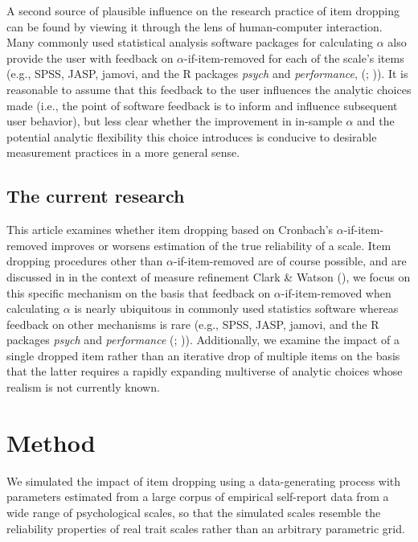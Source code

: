 \documentclass[
  nonatbib,
  authoryear,
  preprint]{elsarticle}
\begin{document}
A second source of plausible influence on the research practice of item
dropping can be found by viewing it through the lens of human-computer
interaction. Many commonly used statistical analysis software packages
for calculating \(\alpha\) also provide the user with feedback on
\(\alpha\)-if-item-removed for each of the scale's items (e.g., SPSS,
JASP, jamovi, and the R packages \emph{psych} and \emph{performance},
(;
)). It is reasonable to
assume that this feedback to the user influences the analytic choices
made (i.e., the point of software feedback is to inform and influence
subsequent user behavior), but less clear whether the improvement in
in-sample \(\alpha\) and the potential analytic flexibility this choice
introduces is conducive to desirable measurement practices in a more
general sense.

\subsection{The current research}\label{the-current-research}

This article examines whether item dropping based on Cronbach's
\(\alpha\)-if-item-removed improves or worsens estimation of the true
reliability of a scale. Item dropping procedures other than
\(\alpha\)-if-item-removed are of course possible, and are discussed in
in the context of measure refinement Clark \& Watson
(), we focus on this
specific mechanism on the basis that feedback on
\(\alpha\)-if-item-removed when calculating \(\alpha\) is nearly
ubiquitous in commonly used statistics software whereas feedback on
other mechanisms is rare (e.g., SPSS, JASP, jamovi, and the R packages
\emph{psych} and \emph{performance}
(;
)). Additionally, we
examine the impact of a single dropped item rather than an iterative
drop of multiple items on the basis that the latter requires a rapidly
expanding multiverse of analytic choices whose realism is not currently
known.

\section{Method}\label{method}

We simulated the impact of item dropping using a data-generating process
with parameters estimated from a large corpus of empirical self-report
data from a wide range of psychological scales, so that the simulated
scales resemble the reliability properties of real trait scales rather
than an arbitrary parametric grid.
\end{document}
